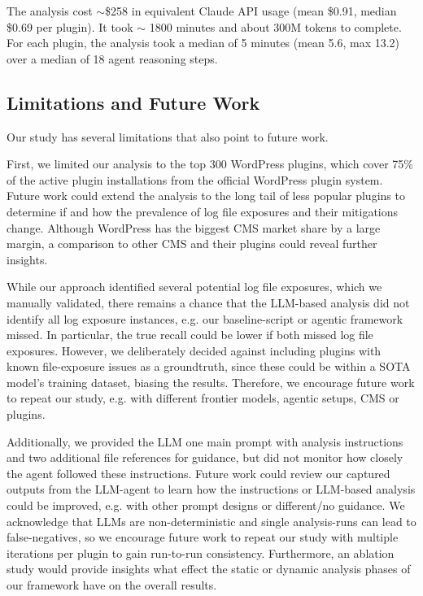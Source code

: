 \documentclass[sigconf]{acmart}
\begin{document}
The analysis cost $\sim$\$258 in equivalent Claude API usage (mean \$0.91, median \$0.69 per plugin). It took $\sim$  1800 minutes and about 300M tokens to complete. For each plugin, the analysis took a median of 5 minutes (mean 5.6, max 13.2) over a median of 18 agent reasoning steps.

\subsection{Limitations and Future Work}\label{sec:disc:limitations}
Our study has several limitations that also point to future work.

First, we limited our analysis to the top 300 WordPress plugins, which cover 75\% of the active plugin installations from the official WordPress plugin system. Future work could extend the analysis to the long tail of less popular plugins to determine if and how the prevalence of log file exposures and their mitigations change. 
Although WordPress has the biggest CMS market share by a large margin, a comparison to other CMS and their plugins could reveal further insights.

While our approach identified several potential log file exposures, which we manually validated, there remains a chance that the LLM-based analysis did not identify all log exposure instances, e.g. our baseline-script or agentic framework missed. In particular, the true recall could be lower if both missed log file exposures. However, we deliberately decided against including plugins with known file-exposure issues as a groundtruth, since these could be within a SOTA model's training dataset, biasing the results. Therefore, we encourage future work to repeat our study, e.g. with different frontier models, agentic setups, CMS or plugins.

Additionally, we provided the LLM one main prompt with analysis instructions and two additional file references for guidance, but did not monitor how closely the agent followed these instructions. Future work could review our captured outputs from the LLM-agent to learn how the instructions or LLM-based analysis could be improved, e.g. with other prompt designs or different/no guidance.
We acknowledge that LLMs are non-deterministic and single analysis-runs can lead to false-negatives, so we encourage future work to repeat our study with multiple iterations per plugin to gain run-to-run consistency. 
Furthermore, an ablation study would provide insights what effect the static or dynamic analysis phases of our framework have on the overall results. 
\end{document}
